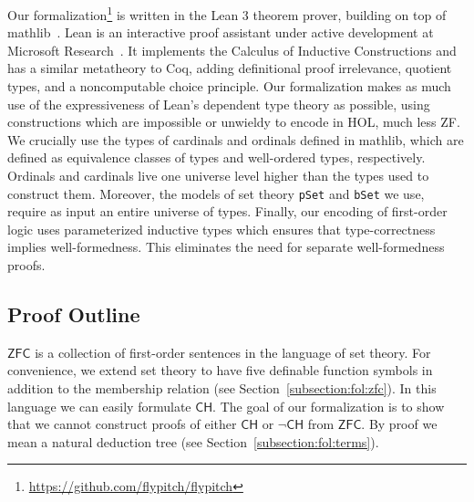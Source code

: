 \documentclass[sigplan,10pt,review, autoref,anonymous]{acmart}
\newcommand{\ZFC}{\mathsf{ZFC}}
\newcommand{\CH}{\mathsf{CH}}
\theoremstyle{definition}
\begin{document}

Our formalization\footnote{\url{https://github.com/flypitch/flypitch}} is written in the Lean 3 theorem prover, building on top of \textsf{mathlib}~\cite{mathlib}. %
Lean is an interactive proof assistant under active development at Microsoft Research~\cite{de2015lean, ullrich2019counting}.
It implements the Calculus of Inductive Constructions and has a similar metatheory to Coq, adding definitional proof irrelevance, quotient types, and a noncomputable choice principle.
Our formalization makes as much use of the expressiveness of Lean's dependent type theory as possible, using constructions which are impossible or unwieldy to encode in HOL, much less ZF.
We crucially use the types of cardinals and ordinals defined in \textsf{mathlib}, which are defined as equivalence classes of types and well-ordered types, respectively. Ordinals and cardinals live one universe level higher than the types used to construct them.
Moreover, the models of set theory \lstinline{pSet} and \lstinline{bSet} we use, require as input an entire universe of types.
Finally, our encoding of first-order logic uses parameterized inductive types which ensures that type-correctness implies well-formedness. This eliminates the need for separate well-formedness proofs.

\subsection{Proof Outline}
\label{subsection:intro:outline}
$\ZFC$ is a collection of first-order sentences in the language of set theory. For convenience, we extend set theory to have five definable function symbols in addition to the membership relation (see Section~\autoref{subsection:fol:zfc}).
In this language we can easily formulate $\CH$.
The goal of our formalization is to show that we cannot construct proofs of either $\CH$ or $\neg\CH$ from $\ZFC$.
By proof we mean a natural deduction tree (see Section~\autoref{subsection:fol:terms}).
\end{document}
